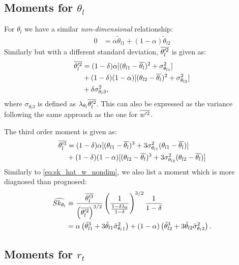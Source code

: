 \subsection{Moments for \texorpdfstring{$\theta_l$}{theta l}}\label{subsec:lowerordermoments_thl}

For $\theta_l$ we have a similar \emph{non-dimensional} relationship:
\begin{align}
    \label{eq:thlp_bar_nondim}
    0 &= \alpha \tilde{\theta}_{l1} + (1 - \alpha) \tilde{\theta}_{l2}
\end{align}
Similarly but with a different standard deviation, $\overline{\theta_l'^2}$ is given as:
\begin{align}
    \label{eq:thlp2_bar}
    \overline{\theta_l'^2}
    &= (1 - \delta) \alpha [(\theta_{l1} - \overline{\theta_l})^2 + \sigma_{\theta_{l1}}^2] \nonumber\\
    &+ (1 - \delta) (1 - \alpha) [(\theta_{l2} - \overline{\theta_l})^2 + \sigma_{\theta_{l2}}^2] \nonumber\\
    &+ \delta \sigma_{\theta_l 3}^2,
\end{align}
where $\sigma_{\theta_l 3}$ is defined as $\lambda_{\theta_l} \overline{\theta_l'^2}$.
This can also be expressed as the variance following the same approach as the one for $\overline{w'^2}$.

The third order moment is given as:
\begin{align}
    \label{eq:theta_l_3_bar}
    \overline{\theta_l'^3}
    &= (1 - \delta) \alpha [(\theta_{l1} - \overline{\theta_l})^3
    + 3 \sigma_{\theta_{l1}}^2 (\theta_{l1} - \overline{\theta_l})] \nonumber\\
    &+ (1 - \delta) (1 - \alpha) [(\theta_{l2} - \overline{\theta_l})^3
    + 3 \sigma_{\theta_{l2}}^2 (\theta_{l2} - \overline{\theta_l})]
\end{align}
Similarly to \cref{eq:sk_hat_w_nondim}, we also list a moment which is more diagnosed than prognosed:
\begin{align}
    \widehat{Sk_{\theta_l}}
    &\equiv \frac{\overline{\theta_l'^3}}{\left(\overline{\theta_l'^2}\right)^{3/2}}
    \left(\frac{1}{\frac{1-\delta \lambda_\theta}{1-\delta}}\right)^{3/2}
    \frac{1}{1-\delta} \nonumber\\
    &= \alpha \left( \tilde{\theta}_{l1}^3 + 3 \tilde{\theta}_{l1} \tilde{\sigma}_{\theta_l 1}^2 \right)
    + (1 - \alpha) \left( \tilde{\theta}_{l2}^3 + 3 \tilde{\theta}_{l2} \tilde{\sigma}_{\theta_l 2}^2 \right).
    \label{eq:sk_hat_theta_l_nondim}
\end{align}

\subsection{Moments for \texorpdfstring{$r_t$}{r t}}\label{subsec:lowerordermoments_rt}

